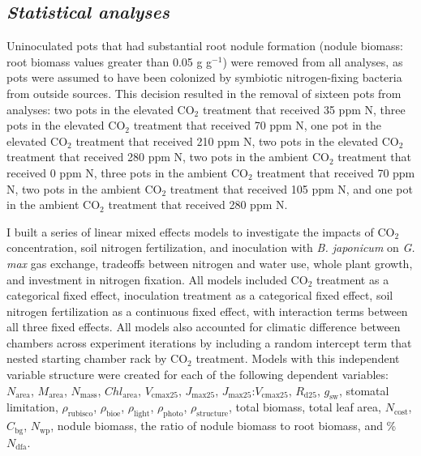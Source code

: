 \subsection{\textit{Statistical analyses}}
\noindent Uninoculated pots that had substantial root nodule formation (nodule biomass: root biomass values greater than 0.05 g g$^{-1}$) were removed from all analyses, as pots were assumed to have been colonized by symbiotic nitrogen-fixing bacteria from outside sources. This decision resulted in the removal of sixteen pots from analyses: two pots in the elevated CO$_2$ treatment that received 35 ppm N, three pots in the elevated CO$_2$ treatment that received 70 ppm N, one pot in the elevated CO$_2$ treatment that received 210 ppm N, two pots in the elevated CO$_2$ treatment that received 280 ppm N, two pots in the ambient CO$_2$ treatment that received 0 ppm N, three pots in the ambient CO$_2$ treatment that received 70 ppm N, two pots in the ambient CO$_2$ treatment that received 105 ppm N, and one pot in the ambient CO$_2$ treatment that received 280 ppm N.

I built a series of linear mixed effects models to investigate the impacts of CO$_2$ concentration, soil nitrogen fertilization, and inoculation with \textit{B. japonicum} on \textit{G. max} gas exchange, tradeoffs between nitrogen and water use, whole plant growth, and investment in nitrogen fixation. All models included CO$_2$ treatment as a categorical fixed effect, inoculation treatment as a categorical fixed effect, soil nitrogen fertilization as a continuous fixed effect, with interaction terms between all three fixed effects. All models also accounted for climatic difference between chambers across experiment iterations by including a random intercept term that nested starting chamber rack by CO$_2$ treatment. Models with this independent variable structure were created for each of the following dependent variables: $N_\mathrm{area}$, $M_\mathrm{area}$, $N_\mathrm{mass}$, $Chl_\mathrm{area}$, $V_\mathrm{cmax25}$, $J_\mathrm{max25}$, $J_\mathrm{max25}$:$V_\mathrm{cmax25}$, $R_\mathrm{d25}$, $g_\mathrm{sw}$, stomatal limitation, $\rho_\mathrm{rubisco}$, $\rho_\mathrm{bioe}$, $\rho_\mathrm{light}$, $\rho_\mathrm{photo}$, $\rho_\mathrm{structure}$, total biomass, total leaf area, $N_\mathrm{cost}$, $C_\mathrm{bg}$, $N_\mathrm{wp}$, nodule biomass, the ratio of nodule biomass to root biomass, and \%$N_\mathrm{dfa}$.

